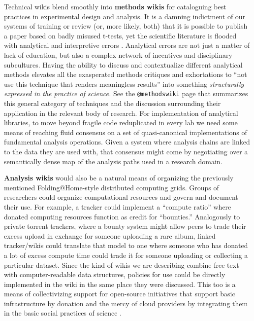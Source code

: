 Technical wikis blend smoothly into \textbf{methods wikis} for
cataloguing best practices in experimental design and analysis. It is a
damning indictment of our systems of training or review (or, more
likely, both) that it is possible to publish a paper based on badly
misused t-tests, yet the scientific literature is flooded with
analytical and interpretive errors \citep{strasakStatisticalErrorsMedical2007, brownIssuesDataAnalyses2018, leekStatisticsValuesAre2015} . Analytical errors are not just a
matter of lack of education, but also a complex network of incentives
and disciplinary subcultures. Having the ability to discuss and
contextualize different analytical methods elevates all the exasperated
methods critiques and exhortations to ``not use this technique that
renders meaningless results'' into something \emph{structurally
expressed in the practice of science.} See the \texttt{@methodswiki}
page that summarizes this general category of techniques and the
discussion surrounding their application in the relevant body of
research. For implementation of analytical libraries, to move beyond
fragile code reduplicated in every lab we need some means of reaching
fluid consensus on a set of quasi-canonical implementations of
fundamental analysis operations. Given a system where analysis chains
are linked to the data they are used with, that consensus might come by
negotiating over a semantically dense map of the analysis paths used in
a research domain.

\textbf{Analysis wikis} would also be a natural means of organizing the
previously mentioned Folding@Home-style distributed computing grids.
Groups of researchers could organize computational resources and govern
and document their use. For example, a tracker could implement a
``compute ratio'' where donated computing resources function as credit
for ``bounties.'' Analogously to private torrent trackers, where a
bounty system might allow peers to trade their excess upload in exchange
for someone uploading a rare album, linked tracker/wikis could translate
that model to one where someone who has donated a lot of excess compute
time could trade it for someone uploading or collecting a particular
dataset. Since the kind of wikis we are describing combine free text
with computer-readable data structures, policies for use could be
directly implemented in the wiki in the same place they were discussed.
This too is a means of collectivizing support for open-source
initiatives that support basic infrastructure by donation and the mercy
of cloud providers by integrating them in the basic social practices of
science \citep{dupreAdvertisingNewInfrastructures2022} .

